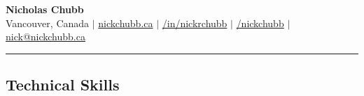 \documentclass[10pt,a4paper]{article}
\begin{document}
 

\begin{center}

{\Huge \textbf{Nicholas Chubb}} \\
\vspace{1em}
{\small
{{ }\faHome { }Vancouver, Canada} $|$ 
{{ }\faGlobe { } \href{https://nickchubb.ca/}{nickchubb.ca}} $|$ 
{{ }\faLinkedinSquare { } \href{https://linkedin.com/in/nickrchubb}{/in/nickrchubb}} $|$ 
{{ }\faGithub { } \href{https://github.com/NickChubb}{/nickchubb}} $|$ 
{{ }\faEnvelope { } \href{mailto:nick@nickchubb.ca}{nick@nickchubb.ca}}\\ \vspace{.2em}
}
\end{center}

\hrule
\vspace{-0.5em}


\subsection*{Technical Skills}

\vspace{-0.2em}
\end{document}
